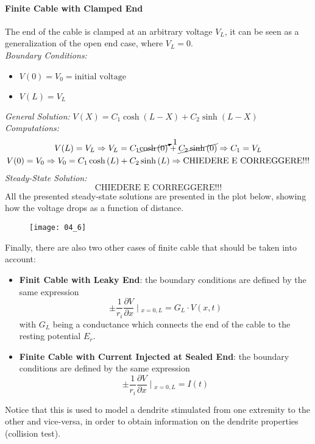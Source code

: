 \paragraph{Finite Cable with Clamped End} The end of the cable is clamped
at an arbitrary voltage \(V_{L}\), it can be seen as a generalization of
the open end case, where \(V_{L}=0\).\\
\textit{Boundary Conditions:}
\begin{itemize}
    \item \(V(0)=V_{0}=\text{initial voltage}\)
    \item \(V(L)=V_{L}\)
\end{itemize}
\textit{General Solution:} \(V(X)=C_{1}\cosh{(L-X)}+C_{2}\sinh{(L-X)}\)\\
\textit{Computations:}
\begin{gather*}
    V(L)=V_{L}
    \Rightarrow{V_{L}=C_{1}\cancelto{1}{\cosh{(0)}}+\cancel{C_{2}\sinh{(0)}}}
    \Rightarrow{C_{1}=V_{L}}\\
    V(0)=V_{0}
    \Rightarrow{V_{0}=C_{1}\cosh{(L)}+C_{2}\sinh{(L)}}
    \Rightarrow{\text{CHIEDERE E CORREGGERE!!!}}
\end{gather*}
\textit{Steady-State Solution:}
\begin{equation*}
    \text{CHIEDERE E CORREGGERE!!!}
\end{equation*}
All the presented steady-state solutions are presented in the plot below, showing
how the voltage drops as a function of distance.
\begin{figure}[H]
    \texttt{[image: 04\_6]}
    \centering
\end{figure}
Finally, there are also two other cases of finite cable that should be taken into
account:
\begin{itemize}
    \item \textbf{Finit Cable with Leaky End}: the boundary conditions are defined
    by the same expression
    \begin{equation*}
        \pm{\frac{1}{r_{i}}\frac{\partial{V}}{\partial{x}}}\mid{}_{x=0,L}=G_{L}\cdot{V(x,t)}
    \end{equation*}
    with \(G_{L}\) being a conductance which connects the end of the cable to the resting
    potential \(E_{r}\).
    \item \textbf{Finite Cable with Current Injected at Sealed End}: the boundary conditions
    are defined by the same expression
    \begin{equation*}
        \pm{\frac{1}{r_{i}}\frac{\partial{V}}{\partial{x}}}\mid{}_{x=0,L}=I(t)
    \end{equation*}
\end{itemize}
Notice that this is used to model a dendrite stimulated from one extremity to the other
and vice-versa, in order to obtain information on the dendrite properties (collision test).
